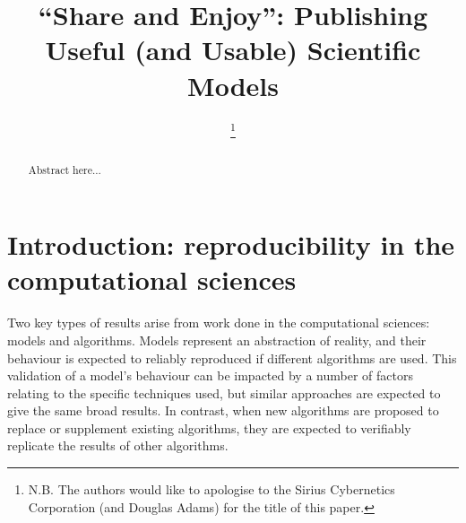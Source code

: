 \documentclass[conference]{IEEEtran}
\begin{document}

\title{``Share and Enjoy'': Publishing Useful (and Usable) Scientific Models}

\author{
%
\thanks{N.B. The authors would like to apologise to the Sirius Cybernetics
  Corporation (and Douglas Adams) for the title of this paper.}
\and
{}
}

\maketitle

\begin{abstract}
Abstract here...
\end{abstract}

\IEEEpeerreviewmaketitle

\section{Introduction: reproducibility in the computational sciences}
Two key types of results arise from work done in the computational
sciences: models and algorithms. Models represent an abstraction of
reality, and their behaviour is expected to reliably reproduced if
different algorithms are used. This validation of a model's behaviour
can be impacted by a number of factors relating to the specific
techniques used, but similar approaches are expected to give the same
broad results.  In contrast, when new algorithms are proposed to
replace or supplement existing algorithms, they are expected to
verifiably replicate the results of other algorithms.
\end{document}
